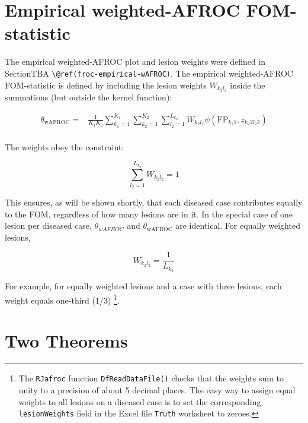 \documentclass[
]{book}
\begin{document}
\hypertarget{froc-meanings-wafroc}{%
\section{Empirical weighted-AFROC FOM-statistic}\label{froc-meanings-wafroc}}

The empirical weighted-AFROC plot and lesion weights were defined in SectionTBA \texttt{\textbackslash{}@ref(froc-empirical-wAFROC)}. The empirical weighted-AFROC FOM-statistic \citep{RN1385} is defined by including the lesion weights \(W_{k_2 l_2}\) inside the summations (but outside the kernel function):

\begin{equation}
\begin{aligned} 
\theta_{\text{wAFROC}} =& \frac{1}{K_1 K_2}\sum_{k_1=1}^{K_1}\sum_{k_2=1}^{K_2}\sum_{l_2=1}^{L_{k_2}}W_{k_2 l_2}\psi\left ( \text{FP}_{k_1 1}, z_{k_2 2 l_2 2} \right )\\
\end {aligned}
\label{eq:froc-meanings-theta-wafroc}
\end{equation}

The weights obey the constraint:

\begin{equation} 
\sum_{l_2=1}^{L_{k_2}}W_{k_2 l_2} = 1
\label{eq:froc-meanings-theta-constraint-weights}
\end{equation}

This ensures, as will be shown shortly, that each diseased case contributes equally to the FOM, regardless of how many lesions are in it. In the special case of one lesion per diseased case, \(\theta_{wAFROC}\) and \(\theta_{\text{wAFROC}}\) are identical. For equally weighted lesions,

\begin{equation} 
W_{k_2 l_2} = \frac{1}{L_{k_2}}
\label{eq:froc-meanings-theta-equal-weights}
\end{equation}

For example, for equally weighted lesions and a case with three lesions, each weight equals one-third (1/3) \footnote{The \texttt{RJafroc} function \texttt{DfReadDataFile()} checks that the weights sum to unity to a precision of about 5 decimal places. The easy way to assign equal weights to all lesions on a diseased case is to set the corresponding \texttt{lesionWeights} field in the Excel file \texttt{Truth} worksheet to zeroes.}.

\hypertarget{froc-meanings-two-theorems}{%
\section{Two Theorems}\label{froc-meanings-two-theorems}}
\end{document}
